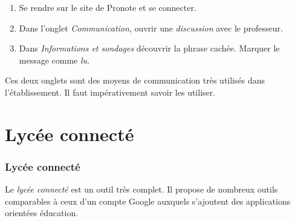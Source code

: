 \documentclass[svgnames,11pt]{beamer}
\begin{document}
\begin{frame}
    \frametitle{}

    \begin{activite}
    \begin{enumerate}
        \item Se rendre sur le site de Pronote et se connecter.
        \item Dans l'onglet \emph{Communication}, ouvrir une \emph{discussion} avec le professeur.
        \item Dans \emph{Informations et sondages} découvrir la phrase cachée. Marquer le message comme \emph{lu}.
    \end{enumerate}
    \end{activite}
\begin{aretenir}[]
Ces deux onglets sont des moyens de communication très utilisés dans l'établissement. Il faut impérativement savoir les utiliser.
\end{aretenir}
\end{frame}
\section{Lycée connecté}
\begin{frame}
    \frametitle{Lycée connecté}

    Le \emph{lycée connecté} est un outil très complet. Il propose de nombreux outils comparables à ceux d'un compte Google auxquels s'ajoutent des applications orientées éducation.

\end{frame}
\end{document}
